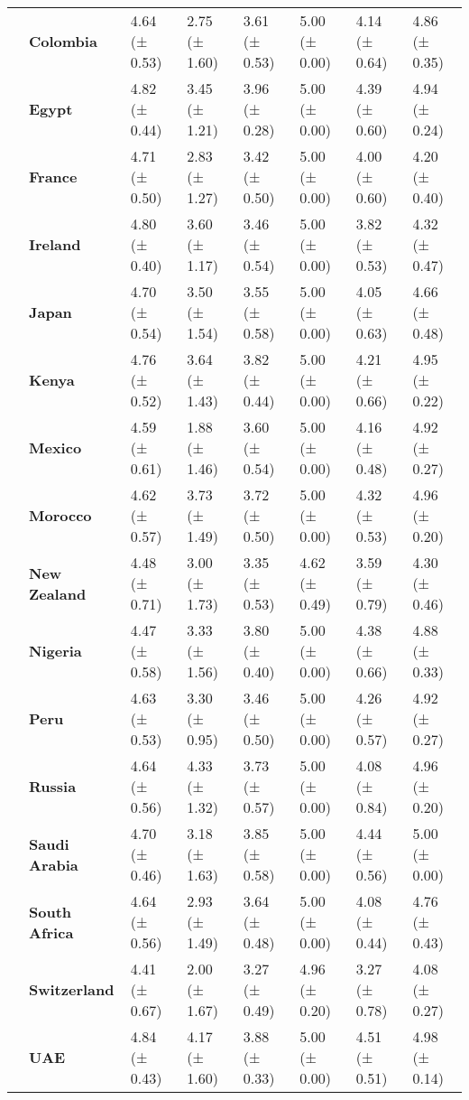 \begin{longtable}{llllllll}
\textbf{} & \textbf{Colombia} & 4.64 (± 0.53) & 2.75 (± 1.60) & 3.61 (± 0.53) & 5.00 (± 0.00) & 4.14 (± 0.64) & 4.86 (± 0.35) \\
\textbf{} & \textbf{Egypt} & 4.82 (± 0.44) & 3.45 (± 1.21) & 3.96 (± 0.28) & 5.00 (± 0.00) & 4.39 (± 0.60) & 4.94 (± 0.24) \\
\textbf{} & \textbf{France} & 4.71 (± 0.50) & 2.83 (± 1.27) & 3.42 (± 0.50) & 5.00 (± 0.00) & 4.00 (± 0.60) & 4.20 (± 0.40) \\
\textbf{} & \textbf{Ireland} & 4.80 (± 0.40) & 3.60 (± 1.17) & 3.46 (± 0.54) & 5.00 (± 0.00) & 3.82 (± 0.53) & 4.32 (± 0.47) \\
\textbf{} & \textbf{Japan} & 4.70 (± 0.54) & 3.50 (± 1.54) & 3.55 (± 0.58) & 5.00 (± 0.00) & 4.05 (± 0.63) & 4.66 (± 0.48) \\
\textbf{} & \textbf{Kenya} & 4.76 (± 0.52) & 3.64 (± 1.43) & 3.82 (± 0.44) & 5.00 (± 0.00) & 4.21 (± 0.66) & 4.95 (± 0.22) \\
\textbf{} & \textbf{Mexico} & 4.59 (± 0.61) & 1.88 (± 1.46) & 3.60 (± 0.54) & 5.00 (± 0.00) & 4.16 (± 0.48) & 4.92 (± 0.27) \\
\textbf{} & \textbf{Morocco} & 4.62 (± 0.57) & 3.73 (± 1.49) & 3.72 (± 0.50) & 5.00 (± 0.00) & 4.32 (± 0.53) & 4.96 (± 0.20) \\
\textbf{} & \textbf{New Zealand} & 4.48 (± 0.71) & 3.00 (± 1.73) & 3.35 (± 0.53) & 4.62 (± 0.49) & 3.59 (± 0.79) & 4.30 (± 0.46) \\
\textbf{} & \textbf{Nigeria} & 4.47 (± 0.58) & 3.33 (± 1.56) & 3.80 (± 0.40) & 5.00 (± 0.00) & 4.38 (± 0.66) & 4.88 (± 0.33) \\
\textbf{} & \textbf{Peru} & 4.63 (± 0.53) & 3.30 (± 0.95) & 3.46 (± 0.50) & 5.00 (± 0.00) & 4.26 (± 0.57) & 4.92 (± 0.27) \\
\textbf{} & \textbf{Russia} & 4.64 (± 0.56) & 4.33 (± 1.32) & 3.73 (± 0.57) & 5.00 (± 0.00) & 4.08 (± 0.84) & 4.96 (± 0.20) \\
\textbf{} & \textbf{Saudi Arabia} & 4.70 (± 0.46) & 3.18 (± 1.63) & 3.85 (± 0.58) & 5.00 (± 0.00) & 4.44 (± 0.56) & 5.00 (± 0.00) \\
\textbf{} & \textbf{South Africa} & 4.64 (± 0.56) & 2.93 (± 1.49) & 3.64 (± 0.48) & 5.00 (± 0.00) & 4.08 (± 0.44) & 4.76 (± 0.43) \\
\textbf{} & \textbf{Switzerland} & 4.41 (± 0.67) & 2.00 (± 1.67) & 3.27 (± 0.49) & 4.96 (± 0.20) & 3.27 (± 0.78) & 4.08 (± 0.27) \\
\textbf{} & \textbf{UAE} & 4.84 (± 0.43) & 4.17 (± 1.60) & 3.88 (± 0.33) & 5.00 (± 0.00) & 4.51 (± 0.51) & 4.98 (± 0.14) \\

\end{longtable}
